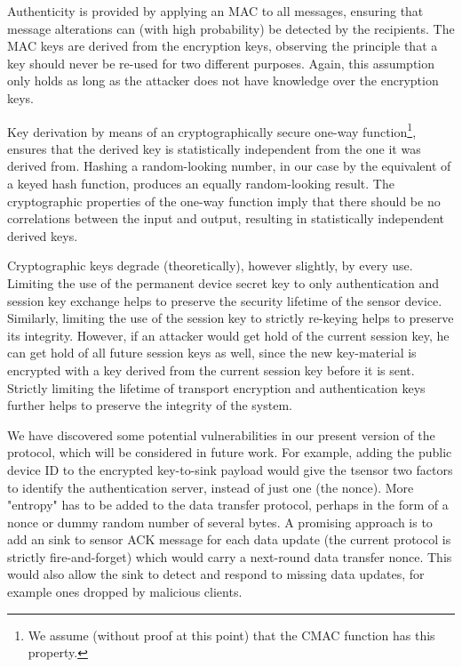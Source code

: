 Authenticity is provided by applying an MAC to all messages, ensuring that message alterations can (with high probability) be detected by the recipients. The MAC keys are derived from the encryption keys, observing the principle that a key should never be re-used for two different purposes.
Again, this assumption only holds as long as the attacker does not have knowledge over the encryption keys. 

Key derivation by means of an cryptographically secure one-way function\footnote{We assume (without proof at this point) that the CMAC function has this property.}, ensures that the derived key is statistically independent from the one it was derived from. Hashing a random-looking number, in our case by the equivalent of a keyed hash function, produces an equally random-looking result. The cryptographic properties of the one-way function imply that there should be no correlations between the input and output, resulting in statistically independent derived keys.


Cryptographic keys degrade (theoretically), however slightly, by every use. Limiting the use of the permanent device secret key to only authentication and session key exchange helps to preserve the security lifetime of the sensor device. Similarly, limiting the use of the session key to strictly re-keying helps to preserve its integrity. However, if an attacker would get hold of the current session key, he can get hold of all future session keys as well, since the new key-material is encrypted with a key derived from the current session key before it is sent. 
%
Strictly limiting the lifetime of transport encryption and authentication keys further helps to preserve the integrity of the system.

We have discovered some potential vulnerabilities in our present version of the protocol, which will be considered in future work. For example, adding the public device ID to the encrypted key-to-sink payload would give the tsensor two factors to identify the authentication server, instead of just one (the nonce). More "entropy" has to be added to the data transfer protocol, perhaps in the form of a nonce or dummy random number of several bytes. A promising approach is to add an sink to sensor ACK message for each data update (the current protocol is strictly fire-and-forget) which would carry a next-round data transfer nonce. This would also allow the sink to detect and respond to  missing data updates, for example ones dropped by malicious clients. 

